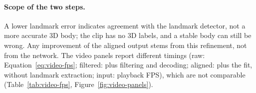\paragraph{Scope of the two steps.} A lower landmark error indicates agreement with the landmark
detector, not a more accurate 3D body; the clip has no 3D labels, and a stable body can still be wrong. Any improvement
of the aligned output stems from this refinement, not from the network. The video panels report different timings (raw: Equation~\eqref{eq:video-fps}; filtered: plus filtering and decoding;
aligned: plus the fit, without landmark extraction; input: playback FPS), which are not comparable
(Table~\ref{tab:video-fps}, Figure~\ref{fig:video-panels}).
